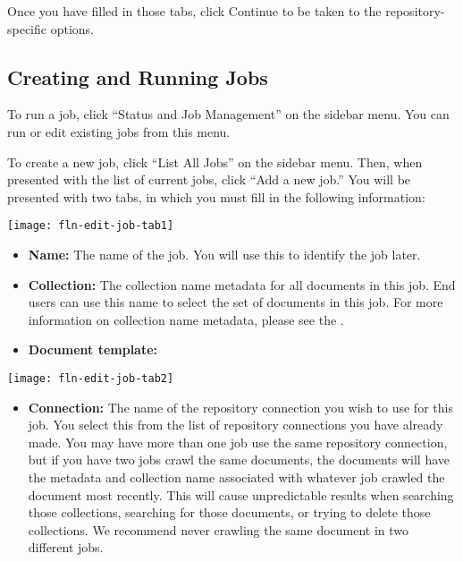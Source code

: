 \begin{changemargin}{1.5in}{0in}
Once you have filled in those tabs, click Continue to be taken to the
repository-specific options.



\subsection{Creating and Running Jobs}

To run a job, click ``Status and Job Management'' on the sidebar menu.
You can run or edit existing jobs from this menu.

To create a new job, click ``List All Jobs'' on the sidebar menu. Then, when
presented with the list of current jobs, click ``Add a new job.'' You
will be presented with two tabs, in which you must fill in the following
information:

\texttt{[image: fln-edit-job-tab1]}

\begin{itemize}

\item \textbf{Name:} The name of the job. You will use this to identify
the job later.

\item \textbf{Collection:} The collection name metadata for all
documents in this job. End users can use this name to select the set
of documents in this job. For more information on collection name
metadata, please see the .

\item \textbf{Document template:} 

\end{itemize}

\texttt{[image: fln-edit-job-tab2]}

\begin{itemize}

\item \textbf{Connection:} The name of the repository connection you
wish to use for this job. You select this from the list of repository
connections you have already made. You may have more than one job use
the same repository connection, but if you have two jobs crawl the same
documents, the documents will have the metadata and collection name
associated with whatever job crawled the document most recently. This
will cause unpredictable results when searching those collections,
searching for those documents, or trying to delete those collections.
We recommend never crawling the same document in two different jobs.


\end{itemize}
\end{changemargin}
